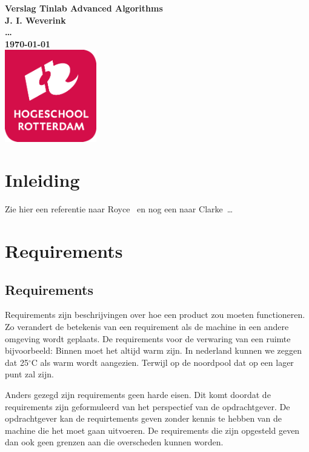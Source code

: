 \documentclass{article}%
\begin{document}
\sffamily
\begin{titlepage}
  \centering
    \vfill
    {\bfseries\Huge
      Verslag Tinlab Advanced Algorithms \\
        \vskip2cm
      }
      {\bfseries\Large
        J. I. Weverink\\
      }
      {
        \bfseries\normalsize
        \ldots\\
        \vskip1cm
        \today\\
    }    
    \vfill
    \includegraphics[width=4cm]{pictures/logohr.png} %
    \vfill
    \vfill
\end{titlepage}
\newpage
\tableofcontents

\newpage
\section{Inleiding}
Zie hier een referentie naar Royce~\cite{royce1987managing} en nog een naar Clarke~\cite{modelchecking}\ldots 

\section{Requirements}

\subsection{Requirements}
Requirements zijn beschrijvingen over hoe een product zou moeten functioneren. Zo verandert de betekenis van een requirement als de machine in een andere omgeving wordt geplaats. De requirements voor de verwaring van een ruimte bijvoorbeeld: Binnen moet het altijd warm zijn. In nederland kunnen we zeggen dat 25$^{\circ}$C als warm wordt aangezien. Terwijl op de noordpool dat op een lager punt zal zijn.

Anders gezegd zijn requirements geen harde eisen. Dit komt doordat de requirements zijn geformuleerd van het perspectief van de opdrachtgever. De opdrachtgever kan de requirtements geven zonder kennis te hebben van de machine die het moet gaan uitvoeren. De requirements die zijn opgesteld geven dan ook geen grenzen aan die overscheden kunnen worden.
\end{document}

